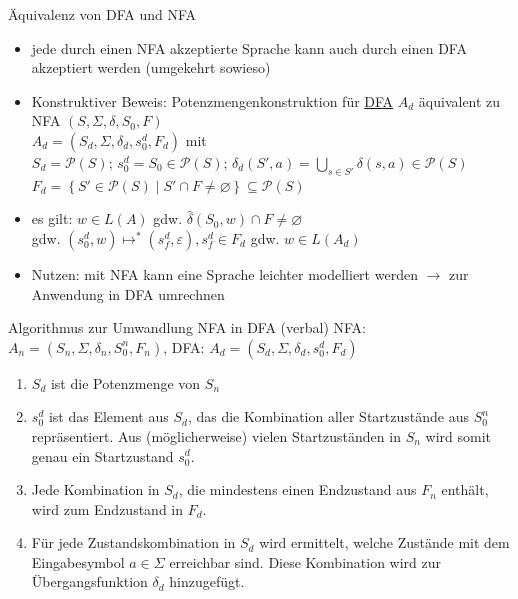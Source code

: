 \begin{frame}{Äquivalenz von DFA und NFA}
	\begin{itemize}
		\item jede durch einen NFA akzeptierte Sprache kann auch durch einen DFA akzeptiert werden (umgekehrt sowieso)
		\item Konstruktiver Beweis: Potenzmengenkonstruktion für \underline{DFA} $A_d$ äquivalent zu NFA $(S, \Sigma, \delta, S_0, F)$\\
		$A_d=\left(S_d, \Sigma, \delta_d, s_0^d, F_d\right)$ mit\\
		\quad $S_d=\mathcal{P}(S)$; 
		\quad $s_0^d=S_0 \in \mathcal{P}(S)$;
		\quad $\delta_d(S', a)=\bigcup_{s \in S'} \delta(s, a) \in \mathcal{P}(S)$\\
		\quad $F_d = \left\{S' \in \mathcal{P}(S) \mid S' \cap F \neq \varnothing\right\} \subseteq \mathcal{P}(S)$
		\item es gilt: $w \in L(A)$ gdw. $\hat{\delta}(S_0, w) \cap F \neq \varnothing$\\
		\quad gdw. $(s_0^d, w) \mapsto^* (s_f^d, \varepsilon), s_f^d \in F_d$ gdw. $w \in L(A_d)$
		\item Nutzen: mit NFA kann eine Sprache leichter modelliert werden $\rightarrow$ zur Anwendung in DFA umrechnen
	\end{itemize}
\end{frame}

\begin{frame}{Algorithmus zur Umwandlung NFA in DFA (verbal)}
	NFA: $A_n=(S_n, \Sigma, \delta_n, S_0^n, F_n)$, DFA: $A_d=(S_d, \Sigma, \delta_d, s_0^d, F_d)$
	\begin{enumerate}
		\item $S_d$ ist die Potenzmenge von $S_n$
		\item $s_0^d$ ist das Element aus $S_d$, das die Kombination aller Startzustände aus $S_0^n$ repräsentiert. Aus (möglicherweise) vielen Startzuständen in $S_n$ wird somit genau ein Startzustand $s_0^d$.
		\item Jede Kombination in $S_d$, die mindestens einen Endzustand aus $F_n$ enthält, wird zum Endzustand in $F_d$.
		\item Für jede Zustandskombination in $S_d$ wird ermittelt, welche Zustände mit dem Eingabesymbol $a \in \Sigma$ erreichbar sind. Diese Kombination wird zur Übergangsfunktion $\delta_d$ hinzugefügt.
	\end{enumerate}
\end{frame}

